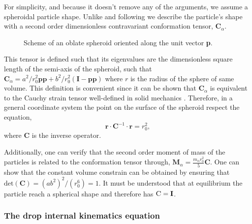 For simplicity, and because it doesn't remove any of the arguments, we assume a spheroidal particle shape. 
Unlike \citet{goddard1967nonlinear,lhuillier1987phenomenology} and following \citet{maffettone1998equation,mwasame2017macroscopic} we describe the particle's shape with a second order dimensionless contravariant conformation tensor, $\textbf{C}_\alpha$.
\begin{figure}[h!]
    \centering
    \hfill
    \hfill
    \caption{Scheme of an  oblate spheroid oriented along the unit vector \textbf{p}.}
    \label{fig:scheme2}
\end{figure}
This tensor is defined such that its eigenvalues are the dimensionless square length of the semi-axis of the spheroid, such that $\textbf{C}_\alpha = a^2/r_0^2 \textbf{pp} + b^2 /r_0^2 (\textbf{I}-\textbf{pp})$ where $r$ is the radius of the sphere of same volume. 
This definition is convenient since it can be shown that $\textbf{C}_\alpha$ is equivalent to the Cauchy strain tensor well-defined in solid mechanics \citet{mwasame2017macroscopic}. 
Therefore, in a general coordinate system the point on the surface of the spheroid respect the equation, 
\begin{equation*}
    \textbf{r}\cdot\textbf{C}^{-1}\cdot\textbf{r} = r_0^2,
\end{equation*}
where $\textbf{C}$ is the inverse operator. 

Additionally, one can verify that the second order moment of mass of the particles is related to the conformation tensor through, $\textbf{M}_\alpha = \frac{m_\alpha  r_0^2}{5} \textbf{C}$. 
One can show that the constant volume constrain can be obtained by ensuring that $\text{det}(\textbf{C}) = (ab^2)^2 /(r_0^6) = 1$. 
It must be understood that at equilibrium the particle reach a spherical shape and therefore has $\textsc{C} = \textbf{I}$. 

\subsubsection*{The drop internal kinematics   equation}



